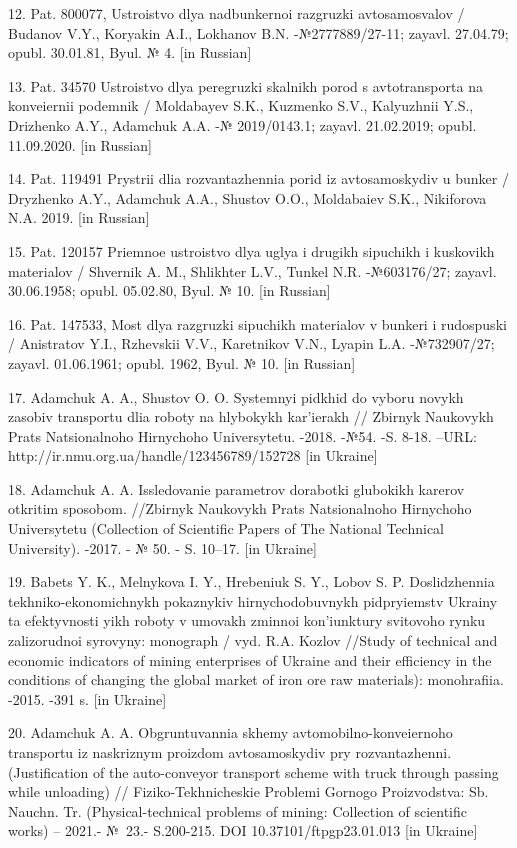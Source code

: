 12. Pat. 800077, Ustroistvo dlya nadbunkernoi razgruzki avtosamosvalov /
Budanov V.Y., Koryakin A.I., Lokhanov B.N. -№2777889/27-11; zayavl.
27.04.79; opubl. 30.01.81, Byul. № 4. {[}in Russian{]}

13. Pat. 34570 Ustroistvo dlya peregruzki skalnikh porod s
avtotransporta na konveiernii podemnik / Moldabayev S.K., Kuzmenko S.V.,
Kalyuzhnii Y.S., Drizhenko A.Y., Adamchuk A.A. -№ 2019/0143.1; zayavl.
21.02.2019; opubl. 11.09.2020. {[}in Russian{]}

14. Pat. 119491 Prystrii dlia rozvantazhennia porid iz avtosamoskydiv u
bunker / Dryzhenko A.Y., Adamchuk A.A., Shustov O.O., Moldabaiev S.K.,
Nikiforova N.A. 2019. {[}in Russian{]}

15. Pat. 120157 Priemnoe ustroistvo dlya uglya i drugikh sipuchikh i
kuskovikh materialov / Shvernik A. M., Shlikhter L.V., Tunkel N.R.
-№603176/27; zayavl. 30.06.1958; opubl. 05.02.80, Byul. № 10. {[}in
Russian{]}

16. Pat. 147533, Most dlya razgruzki sipuchikh materialov v bunkeri i
rudospuski / Anistratov Y.I., Rzhevskii V.V., Karetnikov V.N., Lyapin
L.A. -№732907/27; zayavl. 01.06.1961; opubl. 1962, Byul. № 10. {[}in
Russian{]}

17. Adamchuk A. A., Shustov O. O. Systemnyi pidkhid do vyboru novykh
zasobiv transportu dlia roboty na hlybokykh kar'ierakh // Zbirnyk
Naukovykh Prats Natsionalnoho Hirnychoho Universytetu. -2018. -№54. -S.
8-18. --URL: http://ir.nmu.org.ua/handle/123456789/152728 {[}in
Ukraine{]}

18. Adamchuk A. A. Issledovanie parametrov dorabotki glubokikh karerov
otkritim sposobom. //Zbirnyk Naukovykh Prats Natsionalnoho Hirnychoho
Universytetu (Collection of Scientific Papers of The National Technical
University). -2017. - № 50. - S. 10--17. {[}in Ukraine{]}

19. Babets Y. K., Melnykova I. Y., Hrebeniuk S. Y., Lobov S. P.
Doslidzhennia tekhniko-ekonomichnykh pokaznykiv hirnychodobuvnykh
pidpryiemstv Ukrainy ta efektyvnosti yikh roboty v umovakh zminnoi
kon'iunktury svitovoho rynku zalizorudnoi syrovyny: monograph / vyd.
R.A. Kozlov //Study of technical and economic indicators of mining
enterprises of Ukraine and their efficiency in the conditions of
changing the global market of iron ore raw materials): monohrafiia.
-2015. -391 s. {[}in Ukraine{]}

20. Adamchuk A. A. Obgruntuvannia skhemy avtomobilno-konveiernoho
transportu iz naskriznym proizdom avtosamoskydiv pry rozvantazhenni.
(Justification of the auto-conveyor transport scheme with truck through
passing while unloading) // Fiziko-Tekhnicheskie Problemi Gornogo
Proizvodstva: Sb. Nauchn. Tr. (Physical-technical problems of mining:
Collection of scientific works) -- 2021.- №~23.- S.200-215. DOI
10.37101/ftpgp23.01.013 {[}in Ukraine{]}

